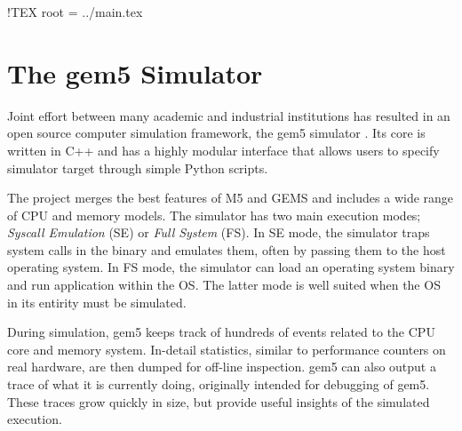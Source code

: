!TEX root = ../main.tex

\section{The gem5 Simulator}

Joint effort between many academic and industrial institutions has resulted in
an open source computer simulation framework, the gem5 simulator \cite{gem5}.
Its core is written in C++ and has a highly modular interface that allows users
to specify simulator target through simple Python scripts.

The project merges the best features of M5 \cite{M5} and GEMS \cite{GEMS} and
includes a wide range of CPU and memory models. The simulator has two main
execution modes; \textit{Syscall Emulation} (SE) or \textit{Full System} (FS).
In SE mode, the simulator traps system calls in the binary and emulates them,
often by passing them to the host operating system. In FS mode, the simulator
can load an operating system binary and run application within the OS. The
latter mode is well suited when the OS in its entirity must be simulated.

During simulation, gem5 keeps track of hundreds of events related to the CPU
core and memory system. In-detail statistics, similar to performance counters on
real hardware, are then dumped for off-line inspection. gem5 can also output a
trace of what it is currently doing, originally intended for debugging of gem5.
These traces grow quickly in size, but provide useful insights of the simulated
execution.
